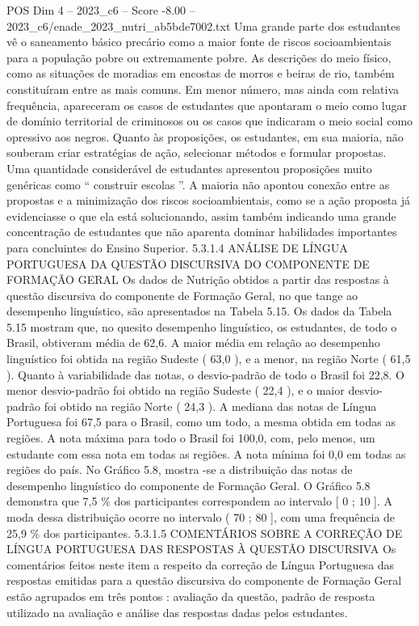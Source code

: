 \begin{textsample}{POS Dim 4 – 2023\_c6 – Score -8.00 – 2023\_c6/enade\_2023\_nutri\_ab5bde7002.txt}
Uma grande parte dos estudantes vê o saneamento básico precário como a maior fonte de riscos socioambientais para a população pobre ou extremamente pobre.
As descrições do meio físico, como as situações de moradias em encostas de morros e beiras de rio, também constituíram entre as mais comuns.
Em menor número, mas ainda com relativa frequência, apareceram os casos de estudantes que apontaram o meio como lugar de domínio territorial de criminosos ou os casos que indicaram o meio social como opressivo aos negros.
Quanto às proposições, os estudantes, em sua maioria, não souberam criar estratégias de ação, selecionar métodos e formular propostas.
Uma quantidade considerável de estudantes apresentou proposições muito genéricas como “ construir escolas ”.
A maioria não apontou conexão entre as propostas e a minimização dos riscos socioambientais, como se a ação proposta já evidenciasse o que ela está solucionando, assim também indicando uma grande concentração de estudantes que não aparenta dominar habilidades importantes para concluintes do Ensino Superior. 5.3.1.4 ANÁLISE DE LÍNGUA PORTUGUESA DA QUESTÃO DISCURSIVA DO COMPONENTE DE FORMAÇÃO GERAL Os dados de Nutrição obtidos a partir das respostas à questão discursiva do componente de Formação Geral, no que tange ao desempenho linguístico, são apresentados na Tabela 5.15.
Os dados da Tabela 5.15 mostram que, no quesito desempenho linguístico, os estudantes, de todo o Brasil, obtiveram média de 62,6.
A maior média em relação ao desempenho linguístico foi obtida na região Sudeste ( 63,0 ), e a menor, na região Norte ( 61,5 ).
Quanto à variabilidade das notas, o desvio-padrão de todo o Brasil foi 22,8.
O menor desvio-padrão foi obtido na região Sudeste ( 22,4 ), e o maior desvio-padrão foi obtido na região Norte ( 24,3 ).
A mediana das notas de Língua Portuguesa foi 67,5 para o Brasil, como um todo, a mesma obtida em todas as regiões.
A nota máxima para todo o Brasil foi 100,0, com, pelo menos, um estudante com essa nota em todas as regiões.
A nota mínima foi 0,0 em todas as regiões do país.
No Gráfico 5.8, mostra -se a distribuição das notas de desempenho linguístico do componente de Formação Geral.
O Gráfico 5.8 demonstra que 7,5 \% dos participantes correspondem ao intervalo [ 0 ; 10 ].
A moda dessa distribuição ocorre no intervalo ( 70 ; 80 ], com uma frequência de 25,9 \% dos participantes. 5.3.1.5 COMENTÁRIOS SOBRE A CORREÇÃO DE LÍNGUA PORTUGUESA DAS RESPOSTAS À QUESTÃO DISCURSIVA Os comentários feitos neste item a respeito da correção de Língua Portuguesa das respostas emitidas para a questão discursiva do componente de Formação Geral estão agrupados em três pontos : avaliação da questão, padrão de resposta utilizado na avaliação e análise das respostas dadas pelos estudantes.

\end{textsample}
